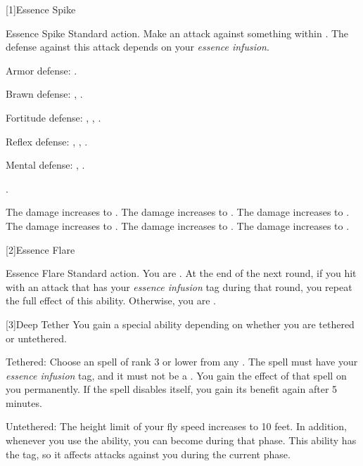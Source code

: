     [1]{Essence Spike}
      \begin{magicalactiveability}{Essence Spike}
        \abilityusagetime Standard action.
        \rankline
        Make an attack against something within \medrange.
        The defense against this attack depends on your \textit{essence infusion}.
        \begin{raggeditemize}
          \item Armor defense: \atWater.
          \item Brawn defense: \atAir, \atEarth.
          \item Fortitude defense: \atAcid, \atAuditory, \atCold.
          \item Reflex defense: \atElectricity, \atFire, \atVisual.
          \item Mental defense: \atCompulsion, \atEmotion.
        \end{raggeditemize}
        \hit \damageranktwo.

        \rankline
         The damage increases to \damagerankthree.
         The damage increases to \damagerankfour.
         The damage increases to \damagerankfive.
         The damage increases to \damageranksix.
         The damage increases to \damagerankseven.
         The damage increases to \damagerankeight.
      \end{magicalactiveability}

    [2]{Essence Flare}
      \begin{magicalactiveability}{Essence Flare}
        \abilityusagetime Standard action.
        \rankline
        You are  \focused.
        At the end of the next round, if you hit with an attack that has your \textit{essence infusion} tag during that round, you repeat the full effect of this ability.
        Otherwise, you are  \maximized.
      \end{magicalactiveability}

    [3]{Deep Tether} You gain a special ability depending on whether you are tethered or untethered.
      \begin{raggeditemize}
        \item Tethered: Choose an \atAttune spell of rank 3 or lower from any .
          The spell must have your \textit{essence infusion} tag, and it must not be a .
          You gain the effect of that spell on you permanently.
          If the spell disables itself, you gain its benefit again after 5 minutes.
        \item Untethered: The height limit of your fly speed increases to 10 feet.
          In addition, whenever you use the  ability, you can become  during that phase.
          This ability has the  tag, so it affects attacks against you during the current phase.
      \end{raggeditemize}

